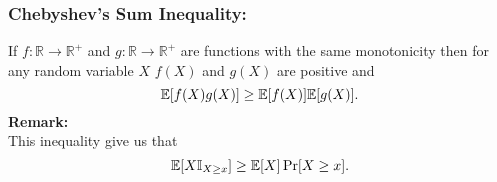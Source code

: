 \documentclass[a4paper,10pt,english]{article}
\begin{document}
\subsubsection*{Chebyshev's Sum Inequality:}
 If $f : \mathbb{R} \rightarrow \mathbb{R}^{+}$ and $g : \mathbb{R} \rightarrow \mathbb{R}^{+}$ are functions with the same
 monotonicity then for any random variable $X$ $f(X)$ and $g(X)$ are positive and
 $$\mathbb{E}[f(X)g(X)] \geq \mathbb{E}[f(X)]\mathbb{E}[g(X)].$$
\textbf{Remark:} \\
 This inequality give us that
 $$\mathbb{E}[X\mathbb{I}_{X\geq x}] \geq \mathbb{E}[X]\Pr[X\geq x].$$
\end{document}
